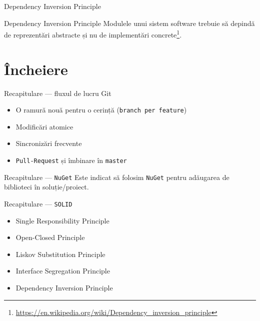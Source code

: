\documentclass[presentation]{beamer}
\begin{document}
\begin{frame}[label={sec:orgd9d0bef}]{Dependency Inversion Principle}
\begin{block}{Dependency Inversion Principle}
Modulele unui sistem software trebuie să depindă de reprezentări abstracte și nu de implementări concrete\footnote{\url{https://en.wikipedia.org/wiki/Dependency\_inversion\_principle}}.
\end{block}
\end{frame}
\section{Încheiere}
\label{sec:orga2c3bd5}
\begin{frame}[label={sec:org9441cc0},fragile]{Recapitulare --- fluxul de lucru Git}
 \begin{itemize}
\item O ramură nouă pentru o cerință (\texttt{branch per feature})
\item Modificări atomice
\item Sincronizări frecvente
\item \texttt{Pull-Request} și îmbinare în \texttt{master}
\end{itemize}
\end{frame}
\begin{frame}[label={sec:orgf5dbb09},fragile]{Recapitulare --- \texttt{NuGet}}
 Este indicat să folosim \texttt{NuGet} pentru adăugarea de biblioteci în soluție/proiect.
\end{frame}
\begin{frame}[label={sec:orgeabd63c},fragile]{Recapitulare --- \texttt{SOLID}}
 \begin{itemize}
\item \alert{Single Responsibility Principle}
\item \alert{Open-Closed Principle}
\item \alert{Liskov Substitution Principle}
\item \alert{Interface Segregation Principle}
\item \alert{Dependency Inversion Principle}
\end{itemize}
\end{frame}
\end{document}
